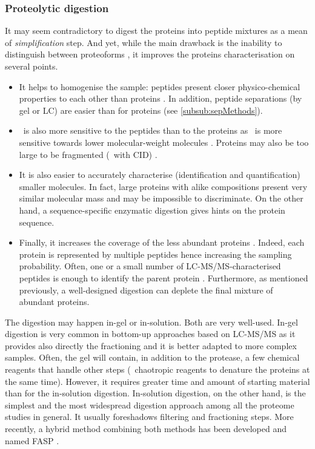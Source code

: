 \subsubsection{Proteolytic digestion}
It may seem contradictory to digest the proteins into peptide mixtures as a mean
of \emph{simplification} step. And yet, while the main drawback is the inability
to distinguish between proteoforms , it improves the proteins
characterisation on several points.
\begin{itemize}
    \item It helps to homogenise the sample: peptides present closer
        physico-chemical properties to each other than proteins .
        In addition, peptide separations (by gel or \gls{LC}) are easier than
        for proteins (see \cref{subsub:sepMethods}).
    \item \ms\ is also more sensitive to the peptides than to the proteins as
        \ms\ is more sensitive towards lower molecular-weight molecules
        . Proteins may also be too large to be
        fragmented (\eg\ with \gls{CID}) .
    \item It is also easier to accurately characterise (identification and
        quantification) smaller molecules. In fact, large proteins with alike
        compositions present very similar molecular mass and may be impossible
        to discriminate. On the other hand, a sequence-specific enzymatic
        digestion gives hints on the protein sequence.
    \item Finally, it increases the coverage of the less abundant proteins
        . Indeed, each protein is represented by multiple
        peptides hence increasing the sampling probability. Often, one or a small
        number of \gls{LC-MS/MS}-characterised peptides is enough to identify the
        parent protein .
        Furthermore, as mentioned previously, a well-designed digestion can deplete
        the final mixture of abundant proteins.
\end{itemize}

The digestion may happen in-gel or in-solution. Both are very well-used.
In-gel digestion is very common in bottom-up approaches based on \gls{LC-MS/MS}
as it provides also directly the fractioning and it is better adapted to more
complex samples. Often, the gel will contain, in addition to the protease, a few
chemical reagents that handle other steps (\eg\ chaotropic reagents to denature
the proteins at the same time). However, it requires greater time and amount of
starting material than for the in-solution digestion. In-solution digestion,
on the other hand, is the simplest and the most widespread
digestion approach among all the proteome studies in general. It usually
foreshadows filtering and fractioning steps. More recently, a hybrid method
combining both methods has been developed and named \acrfull{FASP}
.

